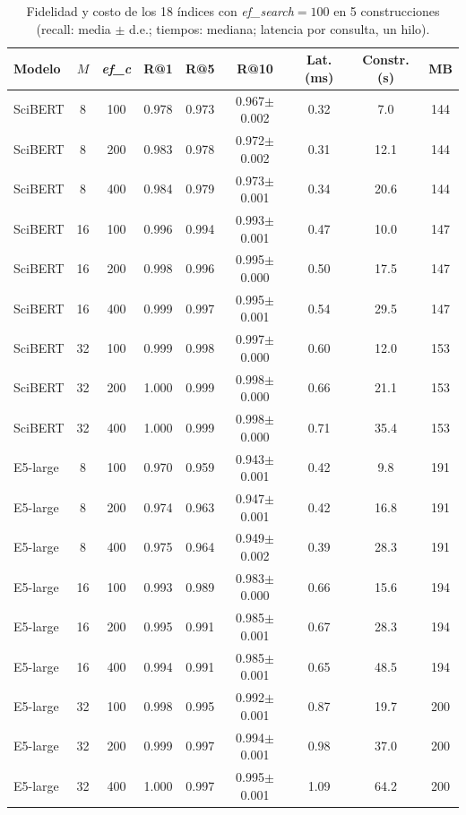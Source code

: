 \begin{table}[tbp]
\caption{Fidelidad y costo de los 18 índices con \textit{ef\_search}$=100$ en 5 construcciones (recall: media $\pm$ d.e.; tiempos: mediana; latencia por consulta, un hilo).}\label{tab:configs}
\centering
\small
\begin{tabular}{|l|c|c|c|c|c|c|c|c|}
\hline
\textbf{Modelo} & \textbf{$M$} & \textbf{\textit{ef\_c}} & \textbf{R@1} & \textbf{R@5} & \textbf{R@10} & \textbf{Lat. (ms)} & \textbf{Constr. (s)} & \textbf{MB} \\
\hline
SciBERT & 8 & 100 & 0.978 & 0.973 & 0.967$\pm$0.002 & 0.32 & 7.0 & 144 \\
SciBERT & 8 & 200 & 0.983 & 0.978 & 0.972$\pm$0.002 & 0.31 & 12.1 & 144 \\
SciBERT & 8 & 400 & 0.984 & 0.979 & 0.973$\pm$0.001 & 0.34 & 20.6 & 144 \\
SciBERT & 16 & 100 & 0.996 & 0.994 & 0.993$\pm$0.001 & 0.47 & 10.0 & 147 \\
SciBERT & 16 & 200 & 0.998 & 0.996 & 0.995$\pm$0.000 & 0.50 & 17.5 & 147 \\
SciBERT & 16 & 400 & 0.999 & 0.997 & 0.995$\pm$0.001 & 0.54 & 29.5 & 147 \\
SciBERT & 32 & 100 & 0.999 & 0.998 & 0.997$\pm$0.000 & 0.60 & 12.0 & 153 \\
SciBERT & 32 & 200 & 1.000 & 0.999 & 0.998$\pm$0.000 & 0.66 & 21.1 & 153 \\
SciBERT & 32 & 400 & 1.000 & 0.999 & 0.998$\pm$0.000 & 0.71 & 35.4 & 153 \\
E5-large & 8 & 100 & 0.970 & 0.959 & 0.943$\pm$0.001 & 0.42 & 9.8 & 191 \\
E5-large & 8 & 200 & 0.974 & 0.963 & 0.947$\pm$0.001 & 0.42 & 16.8 & 191 \\
E5-large & 8 & 400 & 0.975 & 0.964 & 0.949$\pm$0.002 & 0.39 & 28.3 & 191 \\
E5-large & 16 & 100 & 0.993 & 0.989 & 0.983$\pm$0.000 & 0.66 & 15.6 & 194 \\
E5-large & 16 & 200 & 0.995 & 0.991 & 0.985$\pm$0.001 & 0.67 & 28.3 & 194 \\
E5-large & 16 & 400 & 0.994 & 0.991 & 0.985$\pm$0.001 & 0.65 & 48.5 & 194 \\
E5-large & 32 & 100 & 0.998 & 0.995 & 0.992$\pm$0.001 & 0.87 & 19.7 & 200 \\
E5-large & 32 & 200 & 0.999 & 0.997 & 0.994$\pm$0.001 & 0.98 & 37.0 & 200 \\
E5-large & 32 & 400 & 1.000 & 0.997 & 0.995$\pm$0.001 & 1.09 & 64.2 & 200 \\
\hline
\end{tabular}
\end{table}